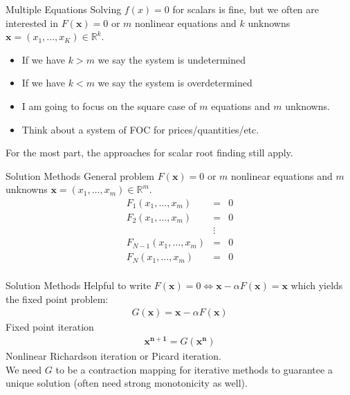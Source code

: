 \documentclass[xcolor=pdftex,dvipsnames,table,mathserif,aspectratio=169]{beamer}
\begin{document}
\begin{frame}{Multiple Equations}
Solving $f(x) = 0$ for scalars is fine, but we often are interested in $F(\mathbf{x}) = 0$ or $m$ nonlinear equations and $k$ unknowns $\mathbf{x} = (x_1,\ldots, x_K) \in \mathbb{R}^k$.
\begin{itemize}
\item If we have $k>m$ we say the system is \alert{undetermined}
\item If we have $k<m$ we say the system is \alert{overdetermined}
\item I am going to focus on the \alert{square} case of $m$ equations and $m$ unknowns.
\item Think about a system of FOC for prices/quantities/etc.
\end{itemize}
For the most part, the approaches for scalar root finding still apply.
\end{frame}

\begin{frame}{Solution Methods}
\vspace{0.5cm}
General problem $F(\mathbf{x}) = 0$ or $m$ nonlinear equations and $m$ unknowns $\mathbf{x} = (x_1,\ldots, x_m) \in \mathbb{R}^m$.
\begin{eqnarray*}
F_1 (x_1,\ldots, x_m)  &=& 0 \\
F_2 (x_1,\ldots, x_m)  &=& 0\\
&\vdots&\\ 
F_{N-1} (x_1,\ldots, x_m)  &=& 0\\
F_N (x_1,\ldots, x_m)  &=& 0\\
\end{eqnarray*}
\end{frame} 

\begin{frame}{Solution Methods}
Helpful to write $F(\mathbf{x}) = 0 \Leftrightarrow \mathbf{x} - \alpha F(\mathbf{x}) = \mathbf{x}$ which yields the fixed point problem:
\begin{eqnarray*}
G(\mathbf{x}) = \mathbf{x} -\alpha F(\mathbf{x})
\end{eqnarray*}
Fixed point iteration
\begin{eqnarray*}
\mathbf{x^{n+1}} = G(\mathbf{x^n})
\end{eqnarray*}
Nonlinear Richardson iteration or Picard iteration.\\
\vspace{0.5cm}
We need $G$ to be a \alert{contraction mapping} for iterative methods to guarantee a unique solution (often need strong monotonicity as well).
\end{frame} 
\end{document}
